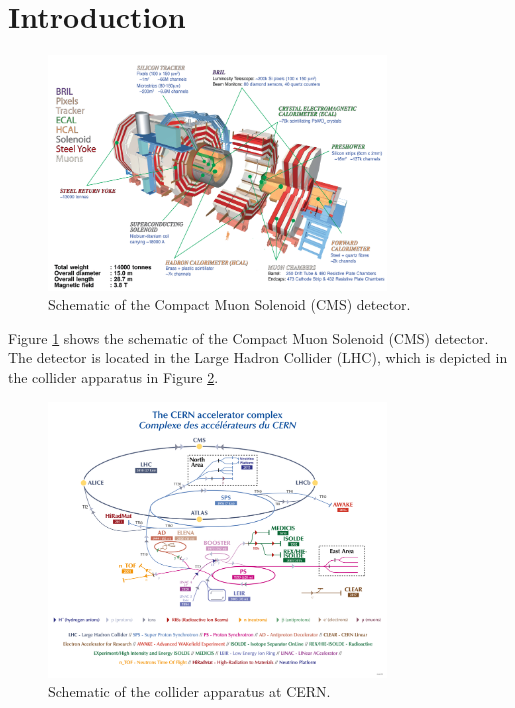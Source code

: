 \section{Introduction}\label{sec:ch3:intro}

 \begin{figure}[h]
\centering
\includegraphics[width=0.8\textwidth]{figures/cms_schematic.png}
\caption{Schematic of the Compact Muon Solenoid (CMS) detector.}
\label{fig:cms}
\end{figure}

Figure \ref{fig:cms} shows the schematic of the Compact Muon Solenoid (CMS) detector. The detector is located in the Large Hadron Collider (LHC), which is depicted in the collider apparatus in Figure \ref{fig:cern}.

 \begin{figure}[h]
\centering
\includegraphics[width=0.8\textwidth]{figures/CCC-v2022.png}
\caption{Schematic of the collider apparatus at CERN.}
\label{fig:cern}
\end{figure}


